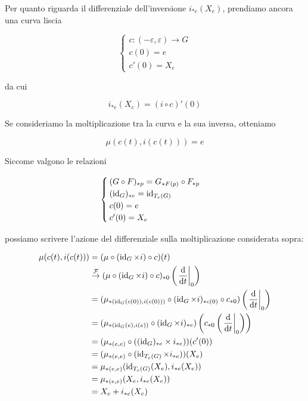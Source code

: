 Per quanto riguarda il differenziale dell'inversione $ i_{*e}(X_{e}) $, prendiamo ancora una curva liscia

\begin{equation}
	\begin{cases}
		c : (-\varepsilon,\varepsilon) \to G \\
		c(0) = e \\
		c'(0) = X_{e}
	\end{cases}
\end{equation}

da cui

\begin{equation}
	i_{*e}(X_{e}) = (i \circ c)'(0)
\end{equation}

Se consideriamo la moltiplicazione tra la curva e la sua inversa, otteniamo

\begin{equation}
	\mu(c(t),i(c(t))) = e
\end{equation}

Siccome valgono le relazioni

\begin{equation}
	\begin{cases}
		(G \circ F)_{*p} = G_{*F(p)} \circ F_{*p} \\
		(\operatorname{id}_{G})_{*e} = \operatorname{id}_{T_{e}(G)} \\
		c(0) = e \\
		c'(0) = X_{e}
	\end{cases}
\end{equation}

possiamo scrivere l'azione del differenziale sulla moltiplicazione considerata sopra:

\begin{align}
	\begin{split}
		\mu(c(t),i(c(t))) &= (\mu \circ (\id_{G} \times i) \circ c) (t) \\
		&\stackrel{\mathcal{F}}{\to} ( \mu \circ (\id_{G} \times i) \circ c )_{*0} \left( \eval{ \dv{t} }_{0} \right) \\
		&= ( \mu_{*(\id_{G}(c(0)), i(c(0)))} \circ (\id_{G} \times i)_{*c(0)} \circ c_{*0} ) \left( \eval{ \dv{t} }_{0} \right) \\
		&= ( \mu_{*(\id_{G}(e), i(e))} \circ (\id_{G} \times i)_{*e} ) \left( c_{*0} \left( \eval{ \dv{t} }_{0} \right) \right) \\
		&= ( \mu_{*(e,e)} \circ ((\id_{G})_{*e} \times i_{*e}) ) (c'(0)) \\
		&= ( \mu_{*(e,e)} \circ (\id_{T_{e}(G)} \times i_{*e}) ) (X_{e}) \\
		&= \mu_{*(e,e)} (\id_{T_{e}(G)} (X_{e}), i_{*e} (X_{e})) \\
		&= \mu_{*(e,e)} (X_{e}, i_{*e} (X_{e})) \\
		&= X_{e} + i_{*e} (X_{e})
	\end{split}
\end{align}

